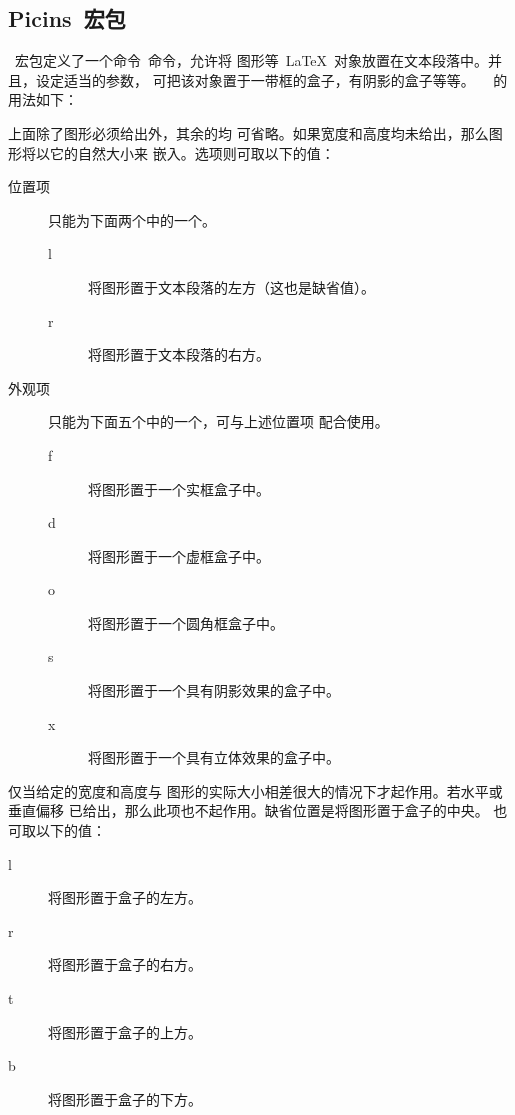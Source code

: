 \subsection{Picins~宏包}\label{ssec:picins}

~宏包定义了一个命令~命令，允许将
图形等~\LaTeX{}~对象放置在文本段落中。并且，设定适当的参数，
可把该对象置于一带框的盒子，有阴影的盒子等等。~~
的用法如下：


\noindent 上面除了{图形}必须给出外，其余的均
可省略。如果宽度和高度均未给出，那么图形将以它的自然大小来
嵌入。{选项}则可取以下的值：
\begin{description}
	\item [ 位置项] 只能为下面两个中的一个。
	\begin{description}
		\item [l] 将图形置于文本段落的左方（这也是缺省值）。
		\item [r] 将图形置于文本段落的右方。
	\end{description}
	\item [ 外观项] 只能为下面五个中的一个，可与上述位置项
	配合使用。
	\begin{description}
		\item [f] 将图形置于一个实框盒子中。
		\item [d] 将图形置于一个虚框盒子中。
		\item [o] 将图形置于一个圆角框盒子中。
		\item [s] 将图形置于一个具有阴影效果的盒子中。
		\item [x] 将图形置于一个具有立体效果的盒子中。
	\end{description}
\end{description}

仅当给定的宽度和高度与
图形的实际大小相差很大的情况下才起作用。若水平或垂直偏移
已给出，那么此项也不起作用。缺省位置是将图形置于盒子的中央。
也可取以下的值：
\begin{description}
	\item [l] 将图形置于盒子的左方。
	\item [r] 将图形置于盒子的右方。
	\item [t] 将图形置于盒子的上方。
	\item [b] 将图形置于盒子的下方。
\end{description}

